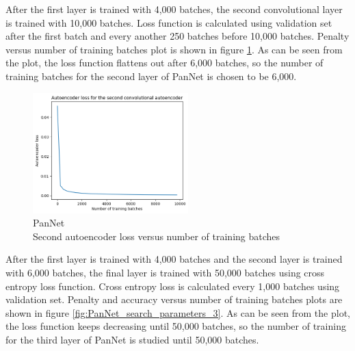 After the first layer is trained with 4,000 batches, the second convolutional layer is trained with 10,000 batches. Loss function is calculated using validation set after the first batch and every another 250 batches before 10,000 batches. Penalty versus number of training batches plot is shown in figure \ref{fig:PanNet_search_parameters_2}. As can be seen from the plot, the loss function flattens out after 6,000 batches, so the number of training batches for the second layer of PanNet is chosen to be 6,000. 

\begin{figure}[th]
\centering
\includegraphics[width=60mm]{Figures/PanNet_search_parameters_2}
\decoRule
\caption{PanNet\\ Second autoencoder loss versus number of training batches}
\label{fig:PanNet_search_parameters_2}
\end{figure}

After the first layer is trained with 4,000 batches and the second layer is trained with 6,000 batches, the final layer is trained with 50,000 batches using cross entropy loss function. Cross entropy loss is calculated every 1,000 batches using validation set. Penalty and accuracy versus number of training batches plots are shown in figure \ref{fig:PanNet_search_parameters_3}. As can be seen from the plot, the loss function keeps decreasing until 50,000 batches, so the number of training for the third layer of PanNet is studied until 50,000 batches.  

